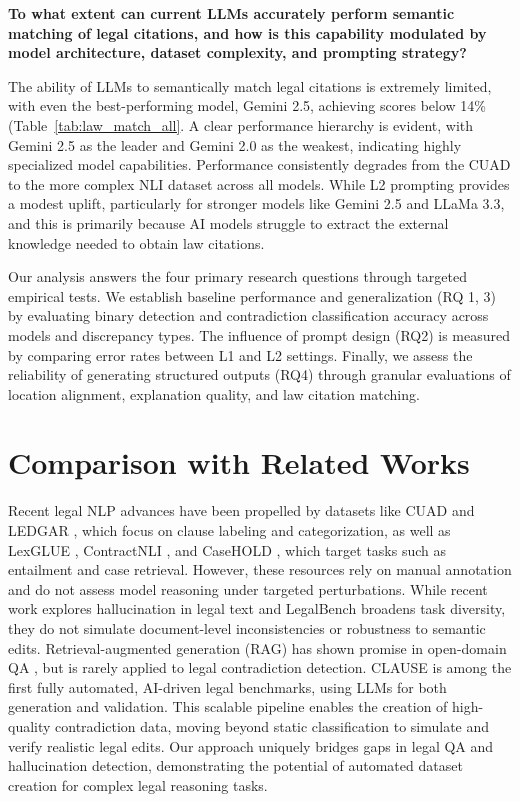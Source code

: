 \documentclass[11pt]{article}
\newcommand{\datasetName}{{\sc CLAUSE}\xspace}
\begin{document}
\noindent\textbf{To what extent can current LLMs accurately perform semantic matching of legal citations, and how is this capability modulated by model architecture, dataset complexity, and prompting strategy?}

\noindent The ability of LLMs to semantically match legal citations is extremely limited, with even the best-performing model, Gemini 2.5, achieving scores below 14\% (Table~\ref{tab:law_match_all}. A clear performance hierarchy is evident, with Gemini 2.5 as the leader and Gemini 2.0 as the weakest, indicating highly specialized model capabilities. Performance consistently degrades from the CUAD to the more complex NLI dataset across all models. While L2 prompting provides a modest uplift, particularly for stronger models like Gemini 2.5 and LLaMa 3.3, and this is primarily because AI models struggle to extract the external knowledge needed to obtain law citations. 

Our analysis answers the four primary research questions through targeted empirical tests. We establish baseline performance and generalization (RQ 1, 3) by evaluating binary detection and contradiction classification accuracy across models and discrepancy types. The influence of prompt design (RQ2) is measured by comparing error rates between L1 and L2 settings. Finally, we assess the reliability of generating structured outputs (RQ4) through granular evaluations of location alignment, explanation quality, and law citation matching.


\section{Comparison with Related Works} 
\vspace{-0.5em}
Recent legal NLP advances have been propelled by datasets like CUAD \cite{hendrycks2021cuad} and LEDGAR \cite{tuggener2020ledgar}, which focus on clause labeling and categorization, as well as LexGLUE \cite{chalkidis2022lexglue}, ContractNLI \cite{koreeda2021contractnli}, and CaseHOLD \cite{zhong2020jec}, which target tasks such as entailment and case retrieval. However, these resources rely on manual annotation and do not assess model reasoning under targeted perturbations. While recent work explores hallucination in legal text \cite{shen2023hallucination} and LegalBench \cite{zheng2023legalbench} broadens task diversity, they do not simulate document-level inconsistencies or robustness to semantic edits. Retrieval-augmented generation (RAG) has shown promise in open-domain QA \cite{lin2022truthfulqa, ji2023haluEval}, but is rarely applied to legal contradiction detection. \datasetName is among the first fully automated, AI-driven legal benchmarks, using LLMs for both generation and validation. This scalable pipeline enables the creation of high-quality contradiction data, moving beyond static classification to simulate and verify realistic legal edits. Our approach uniquely bridges gaps in legal QA and hallucination detection, demonstrating the potential of automated dataset creation for complex legal reasoning tasks.
\vspace{-0.5em}
\end{document}
